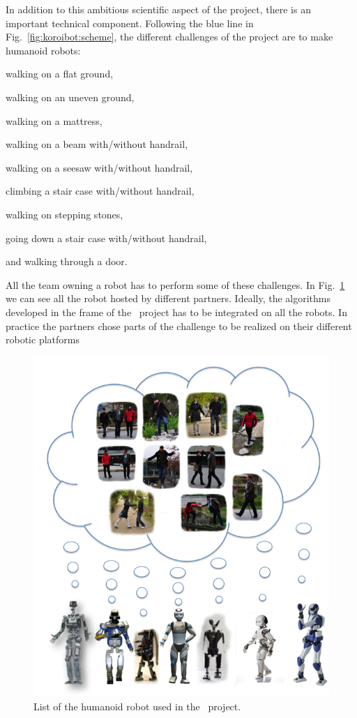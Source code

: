In addition to this ambitious scientific aspect of the project, there is an important technical component.
Following the blue line in Fig.~\ref{fig:koroibot:scheme}, the different challenges of the project are to make humanoid robots:
\begin{list}{ .}{%
		\setlength{\topsep}{5pt}%
		\setlength{\itemsep}{0pt}%
		\setlength{\parsep}{0pt}%
		\setlength{\labelwidth}{3.em}%
		\setlength{\leftmargin}{2em}%
		\setlength{\labelsep}{0.5em}%
	}
\item[\bluesquare] walking on a flat ground,
\item[\bluesquare] walking on an uneven ground,
\item[\bluesquare] walking on a mattress,
\item[\bluesquare] walking on a beam with/without handrail,
\item[\bluesquare] walking on a seesaw with/without handrail,
\item[\bluesquare] climbing a stair case with/without handrail,
\item[\bluesquare] walking on stepping stones,
\item[\bluesquare] going down a stair case with/without handrail,
\item[\bluesquare] and walking through a door.
\end{list}
All the team owning a robot has to perform some of these challenges.
In Fig.~\ref{fig:koroibot:robots} we can see all the robot hosted by different partners.
Ideally, the algorithms developed in the frame of the \koroibot\ project has to be integrated on all the robots.
In practice the partners chose parts of the challenge to be realized on their different robotic platforms

\begin{figure}[ht]
\centering
\includegraphics[width=0.7\linewidth]{figures/koroibot/situations_v2.png}
\caption{List of the humanoid robot used in the \koroibot\ project.}
\label{fig:koroibot:robots}
\end{figure}

